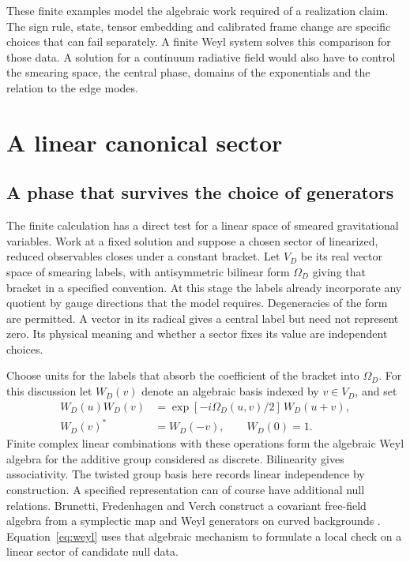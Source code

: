 \documentclass[11pt,letterpaper]{article}
\begin{document}
These finite examples model the algebraic work required of a realization claim. The sign rule, state, tensor embedding and calibrated frame change are specific choices that can fail separately. A finite Weyl system solves this comparison for those data. A solution for a continuum radiative field would also have to control the smearing space, the central phase, domains of the exponentials and the relation to the edge modes.

\section{A linear canonical sector}
\label{sec:weyl}

\subsection{A phase that survives the choice of generators}

The finite calculation has a direct test for a linear space of smeared gravitational variables. Work at a fixed solution and suppose a chosen sector of linearized, reduced observables closes under a constant bracket. Let $V_D$ be its real vector space of smearing labels, with antisymmetric bilinear form $\Omega_D$ giving that bracket in a specified convention. At this stage the labels already incorporate any quotient by gauge directions that the model requires. Degeneracies of the form are permitted. A vector in its radical gives a central label but need not represent zero. Its physical meaning and whether a sector fixes its value are independent choices.

Choose units for the labels that absorb the coefficient of the bracket into $\Omega_D$. For this discussion let $W_D(v)$ denote an algebraic basis indexed by $v\in V_D$, and set
\begin{align}
 W_D(u)W_D(v)&=\exp[-i\Omega_D(u,v)/2]\,W_D(u+v),       \label{eq:weyl}\\
 W_D(v)^*&=W_D(-v),\qquad W_D(0)=1.                    \nonumber
\end{align}
Finite complex linear combinations with these operations form the algebraic Weyl algebra for the additive group considered as discrete. Bilinearity gives associativity. The twisted group basis here records linear independence by construction. A specified representation can of course have additional null relations. Brunetti, Fredenhagen and Verch construct a covariant free-field algebra from a symplectic map and Weyl generators on curved backgrounds \cite[Sec.~2]{bfv}. Equation~\eqref{eq:weyl} uses that algebraic mechanism to formulate a local check on a linear sector of candidate null data.
\end{document}
